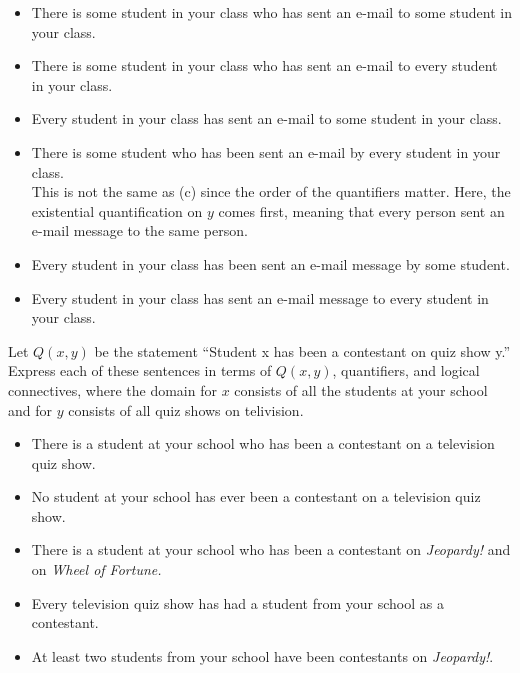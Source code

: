 \documentclass[addpoints]{exam}
\newenvironment{problem}[2][Problem]{\begin{trivlist}
    \item[\hskip \labelsep {\bfseries #1}\hskip \labelsep {\bfseries #2.}]}{\end{trivlist}}
\begin{document}
\begin{sloppypar}
\begin{questions}
    \question
    \begin{solution}
        \begin{itemize}
            \item[(a)] There is some student in your class who has sent an e-mail to some student in your class.
            \item[(b)] There is some student in your class who has sent an e-mail to every student in your class.
            \item[(c)] Every student in your class has sent an e-mail to some student in your class.
            \item[(d)] There is some student who has been sent an e-mail by every student in your class. \\ This is not the same as (c) since the order of the quantifiers matter. Here, the existential quantification on $y$ comes first, meaning that every person sent an e-mail message to the same person.
            \item[(e)] Every student in your class has been sent an e-mail message by some student.
            \item[(f)] Every student in your class has sent an e-mail message to every student in your class.  
        \end{itemize}
    \end{solution}
\end{questions}

\begin{problem}{16}
Let $Q(x,y)$ be the statement ``Student x has been a contestant on quiz show y.'' Express each of these sentences in terms of $Q(x,y)$, quantifiers, and logical connectives, where the domain for $x$ consists of all
the students at your school and for $y$ consists of all quiz shows on telivision.
\begin{itemize}
    \item[(a)] There is a student at your school who has been a contestant on a television quiz show.
    \item[(b)] No student at your school has ever been a contestant on a television quiz show.
    \item[(c)] There is a student at your school who has been a contestant on \textit{Jeopardy!} and on \textit{Wheel of Fortune.}
    \item[(d)] Every television quiz show has had a student from your school as a contestant.
    \item[(e)] At least two students from your school have been contestants on \textit{Jeopardy!}.
\end{itemize}
\end{problem}


\end{sloppypar}
\end{document}
